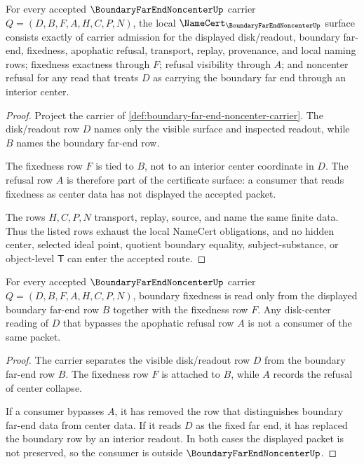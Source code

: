 \begin{theorem}
\label{thm:boundary-far-end-noncenter-obligations}
For every accepted $\BoundaryFarEndNoncenterUp$ carrier $Q=(D,B,F,A,H,C,P,N)$, the local $\NameCert_{\BoundaryFarEndNoncenterUp}$ surface consists exactly of carrier admission for the displayed disk/readout, boundary far-end, fixedness, apophatic refusal, transport, replay, provenance, and local naming rows; fixedness exactness through $F$; refusal visibility through $A$; and noncenter refusal for any read that treats $D$ as carrying the boundary far end through an interior center.
\end{theorem}
\begin{proof}
Project the carrier of \autoref{def:boundary-far-end-noncenter-carrier}. The disk/readout row $D$ names only the visible surface and inspected readout, while $B$ names the boundary far-end row.

The fixedness row $F$ is tied to $B$, not to an interior center coordinate in $D$. The refusal row $A$ is therefore part of the certificate surface: a consumer that reads fixedness as center data has not displayed the accepted packet.

The rows $H,C,P,N$ transport, replay, source, and name the same finite data. Thus the listed rows exhaust the local NameCert obligations, and no hidden center, selected ideal point, quotient boundary equality, subject-substance, or object-level $\mathsf{T}$ can enter the accepted route.
\end{proof}

\begin{theorem}
\label{thm:boundary-far-end-noncenter-fixedness}
For every accepted $\BoundaryFarEndNoncenterUp$ carrier $Q=(D,B,F,A,H,C,P,N)$, boundary fixedness is read only from the displayed boundary far-end row $B$ together with the fixedness row $F$. Any disk-center reading of $D$ that bypasses the apophatic refusal row $A$ is not a consumer of the same packet.
\end{theorem}
\begin{proof}
The carrier separates the visible disk/readout row $D$ from the boundary far-end row $B$. The fixedness row $F$ is attached to $B$, while $A$ records the refusal of center collapse.

If a consumer bypasses $A$, it has removed the row that distinguishes boundary far-end data from center data. If it reads $D$ as the fixed far end, it has replaced the boundary row by an interior readout. In both cases the displayed packet is not preserved, so the consumer is outside $\BoundaryFarEndNoncenterUp$.
\end{proof}


